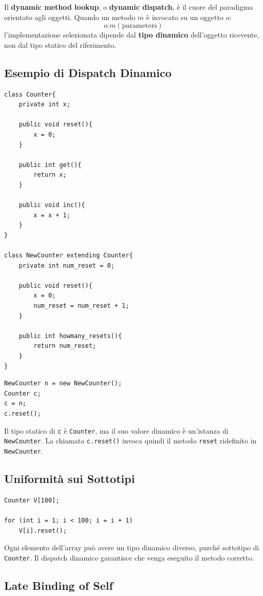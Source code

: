 \documentclass{article}
\begin{document}
Il \textbf{dynamic method lookup}, o \textbf{dynamic dispatch}, è il cuore del paradigma orientato agli oggetti. Quando un metodo $m$ è invocato su un oggetto $o$:
\[
o.m(\mathrm{parameters})
\]
l'implementazione selezionata dipende dal \textbf{tipo dinamico} dell'oggetto ricevente, non dal tipo statico del riferimento.

\subsection{Esempio di Dispatch Dinamico}

\begin{lstlisting}
class Counter{
    private int x;

    public void reset(){
        x = 0;
    }

    public int get(){
        return x;
    }

    public void inc(){
        x = x + 1;
    }
}

class NewCounter extending Counter{
    private int num_reset = 0;

    public void reset(){
        x = 0;
        num_reset = num_reset + 1;
    }

    public int howmany_resets(){
        return num_reset;
    }
}
\end{lstlisting}

\begin{lstlisting}
NewCounter n = new NewCounter();
Counter c;
c = n;
c.reset();
\end{lstlisting}

Il tipo statico di \texttt{c} è \texttt{Counter}, ma il suo valore dinamico è un'istanza di \texttt{NewCounter}. La chiamata \texttt{c.reset()} invoca quindi il metodo \texttt{reset} ridefinito in \texttt{NewCounter}.

\subsection{Uniformità sui Sottotipi}

\begin{lstlisting}
Counter V[100];

for (int i = 1; i < 100; i = i + 1)
    V[i].reset();
\end{lstlisting}

Ogni elemento dell'array può avere un tipo dinamico diverso, purché sottotipo di \texttt{Counter}. Il dispatch dinamico garantisce che venga eseguito il metodo corretto.

\subsection{Late Binding of Self}
\end{document}
